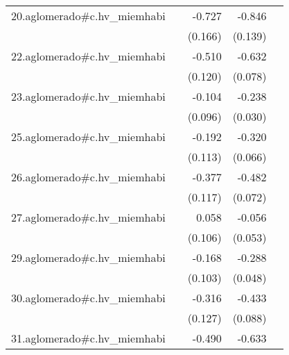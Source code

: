 {\begin{longtable}{l*{4}{D{.}{.}{-1}}}
\addlinespace
20.aglomerado#c.hv\_miemhabi&                     &      -0.727\sym{***}&      -0.846\sym{***}&                     \\
            &                     &     (0.166)         &     (0.139)         &                     \\
\addlinespace
22.aglomerado#c.hv\_miemhabi&                     &      -0.510\sym{***}&      -0.632\sym{***}&                     \\
            &                     &     (0.120)         &     (0.078)         &                     \\
\addlinespace
23.aglomerado#c.hv\_miemhabi&                     &      -0.104         &      -0.238\sym{***}&                     \\
            &                     &     (0.096)         &     (0.030)         &                     \\
\addlinespace
25.aglomerado#c.hv\_miemhabi&                     &      -0.192         &      -0.320\sym{***}&                     \\
            &                     &     (0.113)         &     (0.066)         &                     \\
\addlinespace
26.aglomerado#c.hv\_miemhabi&                     &      -0.377\sym{**} &      -0.482\sym{***}&                     \\
            &                     &     (0.117)         &     (0.072)         &                     \\
\addlinespace
27.aglomerado#c.hv\_miemhabi&                     &       0.058         &      -0.056         &                     \\
            &                     &     (0.106)         &     (0.053)         &                     \\
\addlinespace
29.aglomerado#c.hv\_miemhabi&                     &      -0.168         &      -0.288\sym{***}&                     \\
            &                     &     (0.103)         &     (0.048)         &                     \\
\addlinespace
30.aglomerado#c.hv\_miemhabi&                     &      -0.316\sym{*}  &      -0.433\sym{***}&                     \\
            &                     &     (0.127)         &     (0.088)         &                     \\
\addlinespace
31.aglomerado#c.hv\_miemhabi&                     &      -0.490\sym{***}&      -0.633\sym{***}&                     \\

\end{longtable}}

